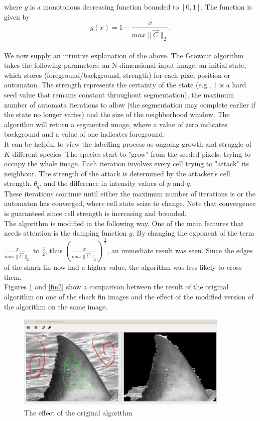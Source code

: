 \documentclass[a4paper,10pt]{article}
\begin{document}
\noindent where $g$ is a monotonous decreasing function bounded to $[0, 1]$. 
The function is given by
\[
g(x) = 1 - \frac{x}{max\| \overrightarrow{C} \|_{2}}. 
\]\\

We now supply an intuitive explanation of the above.
The Growcut algorithm takes the following parameters: an N-dimensional input image,
an initial state, which stores (foreground/background, strength) for
each pixel position or automaton.  The strength represents the
certainty of the state (e.g., 1 is a hard seed value that remains
constant throughout segmentation), the maximum number of automata iterations to allow   
(the segmentation may complete earlier if the state no longer varies) and the
size of the neighborhood window.  The algorithm will return a segmented image, 
where a value of zero indicates background and a value of one indicates foreground. \\

It can be helpful to view the labelling process as ongoing growth and struggle of $K$ different species.
The species start to "grow" from the seeded pixels, trying to occupy the whole image.  
Each iteration involves every cell trying to "attack" its neighbour. 
The strength of the attack is determined by the attacker's cell strength, $\theta_{q}$, and
the difference in intensity values of $p$ and $q$. \\

These iterations continue until either the maximum number of iterations is or the automaton has converged,
where cell state seize to change.  Note that convergence is guaranteed since cell strength is increasing and bounded. \\

\noindent The algorithm is modified in the following way.  One of the
main features that needs attention is the damping function $g$.  By changing
the exponent of the term $\frac{x}{max\| \overrightarrow{C} \|_{2}}$ to
$\frac{3}{2}$, thus $\left ({\frac{x}{max\| \overrightarrow{C} \|_{2}}}\right
) ^\frac{3}{2}$,
an immediate result was seen.  Since the edges of the shark fin now 
  had a higher value, the algorithm was less likely to cross them. \\  
 
Figures \ref{fin1} and \ref{fin2} show a comparison between the result of the original algorithm on
one of the shark fin images and the effect of the modified version of the
algorithm on the same image.

\begin{figure}[H]
 \centering
 \includegraphics[width=4in, height=1.8in]{haaio}
 \caption{The effect of the original algorithm}
 \label{fin1}
\end{figure}
\end{document}
